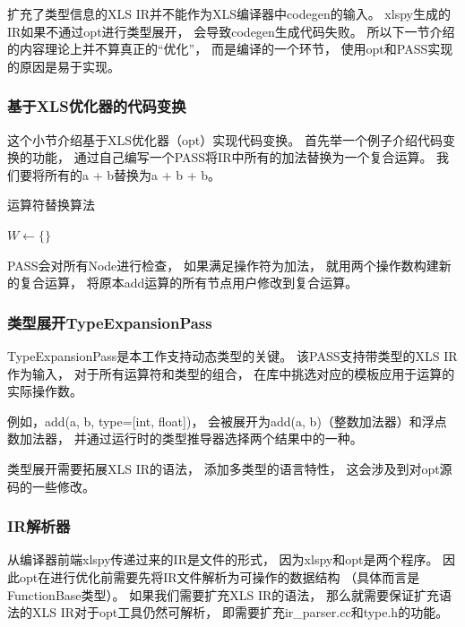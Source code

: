 扩充了类型信息的XLS IR并不能作为XLS编译器中codegen的输入。
xlspy生成的IR如果不通过opt进行类型展开，
会导致codegen生成代码失败。
所以下一节介绍的内容理论上并不算真正的“优化”，
而是编译的一个环节，
使用opt和PASS实现的原因是易于实现。

\subsubsection{基于XLS优化器的代码变换}

这个小节介绍基于XLS优化器（opt）实现代码变换。
首先举一个例子介绍代码变换的功能，
通过自己编写一个PASS将IR中所有的加法替换为一个复合运算。
我们要将所有的a + b替换为a + b + b。

\begin{algorithm}[H]
\caption{运算符替换算法}
\SetAlgoLined
{}
$W \gets \{\}$\;
\end{algorithm}

PASS会对所有Node进行检查，
如果满足操作符为加法，
就用两个操作数构建新的复合运算，
将原本add运算的所有节点用户修改到复合运算。

\subsubsection{类型展开TypeExpansionPass}\label{typeexpansionpass}

TypeExpansionPass是本工作支持动态类型的关键。
该PASS支持带类型的XLS IR作为输入，
对于所有运算符和类型的组合，
在库中挑选对应的模板应用于运算的实际操作数。

例如，add(a, b, type=[int, float])，
会被展开为add(a, b)（整数加法器）和浮点数加法器，
并通过运行时的类型推导器选择两个结果中的一种。

类型展开需要拓展XLS IR的语法，
添加多类型的语言特性，
这会涉及到对opt源码的一些修改。

\subsubsection{IR解析器}\label{ir_parser}

从编译器前端xlspy传递过来的IR是文件的形式，
因为xlspy和opt是两个程序。
因此opt在进行优化前需要先将IR文件解析为可操作的数据结构
（具体而言是FunctionBase类型）。
如果我们需要扩充XLS IR的语法，
那么就需要保证扩充语法的XLS IR对于opt工具仍然可解析，
即需要扩充ir\_parser.cc和type.h的功能。

